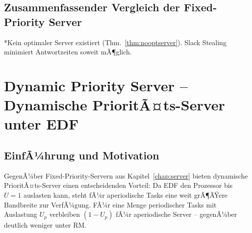 ﻿\documentclass[a4paper,12pt]{report}
\theoremstyle{definition}
\begin{document}
\section{Zusammenfassender Vergleich der Fixed-Priority Server}

\begin{table}[H]
	\centering
	\caption{Vergleich der Fixed-Priority Server -- VollstÃ¤ndige Ãœbersicht}

	\smallskip
	\noindent\small{*Kein optimaler Server existiert (Thm.~\ref{thm:nooptserver}).
	Slack Stealing minimiert Antwortzeiten soweit mÃ¶glich.}
\end{table}

\chapter{Dynamic Priority Server -- Dynamische PrioritÃ¤ts-Server unter EDF}
\label{chap:dynserver}

\section{EinfÃ¼hrung und Motivation}

GegenÃ¼ber Fixed-Priority-Servern aus Kapitel~\ref{chap:server} bieten dynamische
PrioritÃ¤ts-Server einen entscheidenden Vorteil: Da EDF den Prozessor bis $U=1$
auslasten kann, steht fÃ¼r aperiodische Tasks eine weit grÃ¶ÃŸere Bandbreite zur
VerfÃ¼gung. FÃ¼r eine Menge periodischer Tasks mit Auslastung $U_p$ verbleiben
$(1-U_p)$ fÃ¼r aperiodische Server -- gegenÃ¼ber deutlich weniger unter RM.
\end{document}
